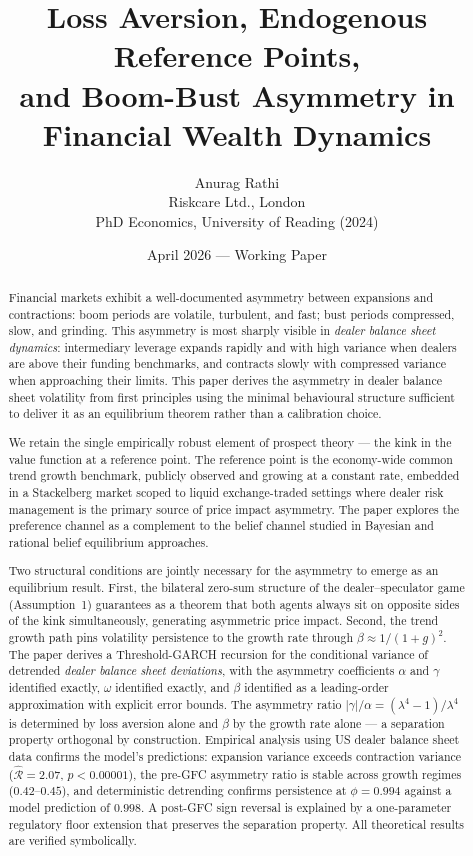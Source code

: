 \documentclass[12pt,a4paper]{article}
\title{Loss Aversion, Endogenous Reference Points,\\
       and Boom-Bust Asymmetry in Financial Wealth Dynamics}
\author{Anurag Rathi\\
        \small Riskcare Ltd., London\\
        \small PhD Economics, University of Reading (2024)}
\date{April 2026 --- Working Paper}
\theoremstyle{definition}
\begin{document}
\maketitle


\begin{abstract}
Financial markets exhibit a well-documented asymmetry between expansions and
contractions: boom periods are volatile, turbulent, and fast; bust periods
compressed, slow, and grinding. This asymmetry is most sharply visible in
\emph{dealer balance sheet dynamics}: intermediary leverage expands rapidly
and with high variance when dealers are above their funding benchmarks, and
contracts slowly with compressed variance when approaching their limits.
This paper derives the asymmetry in dealer balance sheet volatility from first
principles using the minimal behavioural structure sufficient to deliver it as
an equilibrium theorem rather than a calibration choice.

We retain the single empirically robust element of prospect theory --- the kink
in the value function at a reference point. The reference point is the
economy-wide common trend growth benchmark, publicly observed and growing at a
constant rate, embedded in a Stackelberg market scoped to liquid exchange-traded
settings where dealer risk management is the primary source of price impact
asymmetry. The paper explores the preference channel as a complement to the
belief channel studied in Bayesian and rational belief equilibrium approaches.

Two structural conditions are jointly necessary for the asymmetry to
emerge as an equilibrium result. First, the bilateral zero-sum
structure of the dealer--speculator game (Assumption~1) guarantees as a theorem
that both agents always sit on opposite sides of the kink simultaneously,
generating asymmetric price impact. Second, the trend growth path pins
volatility persistence to the growth rate through $\beta \approx 1/(1+g)^2$.
The paper derives a Threshold-GARCH recursion for the conditional variance of
detrended \emph{dealer balance sheet deviations}, with the asymmetry
coefficients $\alpha$ and $\gamma$ identified exactly, $\omega$ identified
exactly, and $\beta$ identified as a leading-order approximation with
explicit error bounds. The asymmetry ratio $|\gamma|/\alpha =
(\lambda^4-1)/\lambda^4$ is determined by loss aversion alone and
$\beta$ by the growth rate alone --- a separation property orthogonal by
construction. Empirical analysis using US dealer balance sheet data
confirms the model's predictions: expansion variance exceeds contraction
variance ($\hat{\mathcal{R}} = 2.07$, $p < 0.00001$), the pre-GFC
asymmetry ratio is stable across growth regimes ($0.42$--$0.45$), and
deterministic detrending confirms persistence at $\hat{\phi} = 0.994$
against a model prediction of $0.998$. A post-GFC sign reversal is
explained by a one-parameter regulatory floor extension that preserves
the separation property. All theoretical results are verified symbolically.
\end{abstract}
\end{document}
